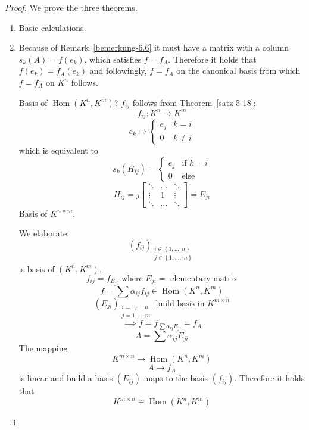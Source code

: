 \documentclass[a4paper,landscape,twocolumn]{article}
\newcommand\set[1]{\left\{#1\right\}}
\DeclareMathOperator\Hom{Hom} %
\begin{document}
\begin{proof}
  We prove the three theorems.
  \begin{enumerate}
    \item Basic calculations.
    \item Because of Remark~\ref{bemerkung-6.6} it must have a matrix with a
      column $s_k(A) = f(e_k)$, which satisfies $f = f_A$.
      Therefore it holds that $f(e_k) = f_A(e_k)$ and followingly,
      $f = f_A$ on the canonical basis from which $f = f_A$ on $K^n$ follows.

      Basis of $\Hom(K^n, K^m)$?
      $f_{ij}$ follows from Theorem~\ref{satz-5-18}:
      \[ f_{ij}: K^n \rightarrow K^m \]
      \[
        e_k \mapsto \begin{cases}
          e_j & k=i \\
          0 & k \neq i
        \end{cases}
      \]
      which is equivalent to
      \[
        s_k(H_{ij}) = \begin{cases}
          e_j & \text{if } k = i \\
          0 & \text{else}
        \end{cases}
      \]
      \[
        H_{ij} = j \begin{bmatrix}
          \ddots & \ldots & \ddots \\
          \vdots & 1 & \vdots \\
          \ddots & \ldots & \ddots
        \end{bmatrix} = E_{ji}
      \]
      Basis of $K^{n\times m}$.

      We elaborate:
      \[ (f_{ij})_{\substack{i \in \set{1, \ldots, n} \\ j \in \set{1, \ldots, m}}} \]
      is basis of $(K^n, K^m)$.
      \[ f_{ij} = f_{E_{ji}} \text{ where } E_{ji} = \text{ elementary matrix} \]
      \[ f = \sum \alpha_{ij} f_{ij} \in \Hom(K^n, K^m) \]
      \[ (E_{ji})_{\substack{i = 1,\ldots,n \\ j = 1,\ldots,m}} \text{ build basis in } K^{m \times n} \]
      \[ \implies f = f_{\sum \alpha_{ij} E_{ji}} = f_A \]
      \[ A = \sum \alpha_{ij} E_{ji} \]
      The mapping
      \[ K^{m\times n} \rightarrow \Hom(K^n, K^m) \]
      \[ A \rightarrow f_A \]
      is linear and build a basis $(E_{ij})$ maps to the basis $(f_{ij})$.
      Therefore it holds that
      \[ K^{m\times n} \cong \Hom(K^n, K^m) \]
  \end{enumerate}
\end{proof}
\end{document}
